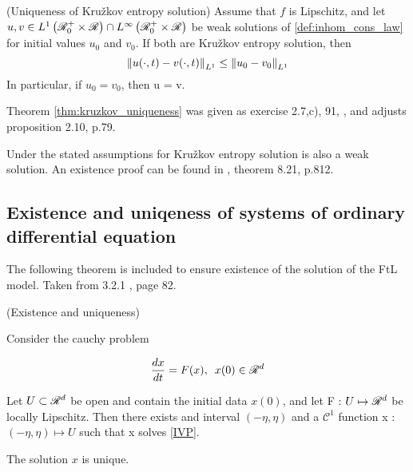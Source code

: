 \begin{definition}
\begin{theorem}(Uniqueness of Kružkov entropy solution) \label{thm:kruzkov_uniqueness}
	Assume that $f$ is Lipschitz, and let $u,v \in L^1\left(\mathscr{R}^+_0 \times \mathscr{R}\right) \cap L^\infty\left(\mathscr{R}^+_0 \times \mathscr{R}\right)$ be weak solutions of \eqref{def:inhom_cons_law} for initial values $u_0$ and $v_0$. If both are Kružkov entropy solution, then 
	\begin{equation}
		\left\lVert u(\cdot, t) - v(\cdot, t)\right\rVert_{L^1} \leq \left\lVert u_0 - v_0\right\rVert_{L^1}
	\end{equation}
	In particular, if $u_0 = v_0$, then u = v. 
\end{theorem}
	
Theorem \eqref{thm:kruzkov_uniqueness} was given as exercise 2.7,c), 91, , and adjusts proposition 2.10, p.79. 

\begin{remark}
	Under the stated assumptions for  Kružkov entropy solution is also a weak solution. An existence proof can be found in \cite{holden2015front}, theorem 8.21, p.812. 
\end{remark}

\subsection{Existence and uniqeness of systems of ordinary differential equation}

The following theorem is included to ensure existence of the solution of the FtL model. Taken from 3.2.1 \cite{david2018ordinary}, page 82. 
\begin{theorem}(Existence and uniqueness)
	
	Consider the cauchy problem
	
	\begin{equation} \label{IVP}
		\frac{dx}{dt} = F(x), \,\,\, x(0)  \in \mathscr{R}^d
	\end{equation}

	Let $U \subset \mathscr{R}^d$ be open and contain the initial data $x(0)$, and let F : $U \mapsto \mathscr{R}^d$ be locally Lipschitz. Then there exists and interval $(-\eta, \eta)$ and a $\mathscr{C}^1$ function x : $(-\eta, \eta) \mapsto U$ such that x solves \eqref{IVP}. 
	
	The solution $x$ is unique.
\end{theorem}







\iffalse


\end{definition}
